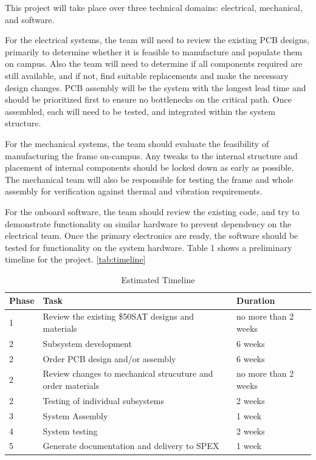 \documentclass[conference]{IEEEtran} %
\begin{document}
This project will take place over three technical domains: electrical, mechanical, and software.

For the electrical systems, the team will need to review the existing PCB designs, primarily to determine whether it is feasible to manufacture and populate them on campus.
Also the team will need to determine if all components required are still available, and if not, find suitable replacements and make the necessary design changes.
PCB assembly will be the system with the longest lead time and should be prioritized first to ensure no bottlenecks on the critical path.
Once assembled, each will need to be tested, and integrated within the system structure.

For the mechanical systems, the team should evaluate the feasibility of manufacturing the frame on-campus.
Any tweaks to the internal structure and placement of internal components should be locked down as early as possible.
The mechanical team will also be responsible for testing the frame and whole assembly for verification against thermal and vibration requirements.

For the onboard software, the team should review the existing code, and try to demonstrate functionality on similar hardware to prevent dependency on the electrical team.
Once the primary electronics are ready, the software should be tested for functionality on the system hardware.
Table 1 shows a preliminary timeline for the project.
\autoref{tab:timeline}
\begin{table}
  \caption{Estimated Timeline}
  \small\centering
  \begin{tabular}{@{}lll@{}} \toprule
    Phase & Task & Duration \\ \midrule
    1 & Review the existing \$50SAT designs and materials &  no more than 2 weeks \\
    2 & Subsystem development & 6 weeks \\
    2 & Order PCB design and/or assembly & 6 weeks \\
    2 & Review changes to mechanical strucuture and order materials & no more than 2 weeks \\
    2 & Testing of individual subsystems & 2 weeks \\
    3 & System Assembly & 1 week  \\
    4 & System testing & 2 weeks  \\
    5 & Generate documentation and delivery to SPEX & 1 week  \\
    \bottomrule
  \end{tabular}
\label{tab:timeline}
\end{table}
\end{document}
